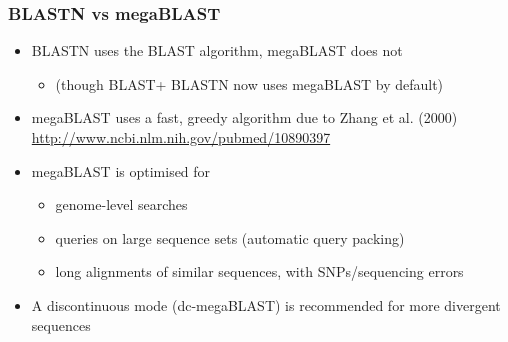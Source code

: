 \documentclass[table]{beamer}
\begin{document}
  \begin{frame}
    \frametitle{BLASTN vs megaBLAST}
    \begin{itemize}
      \item<1-> BLASTN uses the BLAST algorithm, megaBLAST does not
      \begin{itemize}
        \item (though BLAST+ BLASTN now uses megaBLAST by default)
      \end{itemize}      
      \item<1-> megaBLAST uses a fast, greedy algorithm due to Zhang et al. (2000) \url{http://www.ncbi.nlm.nih.gov/pubmed/10890397}
      \item<2-> megaBLAST is optimised for
      \begin{itemize}
        \item genome-level searches
        \item queries on large sequence sets (automatic query packing)
        \item long alignments of similar sequences, with SNPs/sequencing errors
      \end{itemize}
      \item<2-> A discontinuous mode (dc-megaBLAST) is recommended for more divergent sequences
    \end{itemize}
\end{frame}   
    
\end{document}
